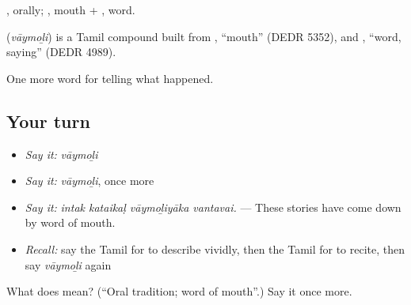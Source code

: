 , orally; , mouth + , word.

\begin{cousinweb}
\textbf{} (\emph{vāymoḻi}) is a Tamil compound built from , \textquotedblleft{}mouth\textquotedblright{} (DEDR 5352), and , \textquotedblleft{}word, saying\textquotedblright{} (DEDR 4989).
\end{cousinweb}

\begin{grammarlens}[title={What you've built}]
One more word for telling what happened.
\end{grammarlens}

\subsection*{Your turn}
\begin{itemize}
\raggedright
  \item \emph{Say it:} \emph{vāymoḻi}
  \item \emph{Say it:} \emph{vāymoḻi}, once more
  \item \emph{Say it:} \emph{intak kataikaḷ vāymoḻiyāka vantavai.} — These stories have come down by word of mouth.
  \item \emph{Recall:} say the Tamil for to describe vividly, then the Tamil for to recite, then say \emph{vāymoḻi} again
\end{itemize}

\begin{tcolorbox}[breakable,colback=teal!4,colframe=teal!35!black,title={Before you move on}]
What does  mean? (\textquotedblleft{}Oral tradition; word of mouth\textquotedblright{}.) Say it once more.
\end{tcolorbox}
